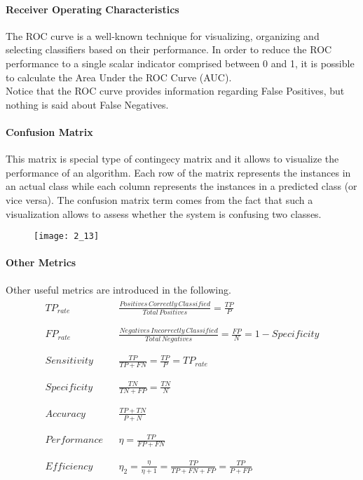 \paragraph{Receiver Operating Characteristics} The ROC curve is a well-known technique
for visualizing, organizing and selecting classifiers based on their performance.
In order to reduce the ROC performance to a single scalar indicator comprised between 0 and 1,
it is possible to calculate the Area Under the ROC Curve (AUC).\\
Notice that the ROC curve provides information regarding False Positives, but nothing
is said about False Negatives.
\paragraph{Confusion Matrix} This matrix is special type of contingecy matrix and
it allows to visualize the performance of an algorithm. Each row of the matrix
represents the instances in an actual class while each column represents the instances
in a predicted class (or vice versa). The confusion matrix term comes from the fact that
such a visualization allows to assess whether the system is confusing two classes.
\begin{figure}[H]
    \texttt{[image: 2\_13]}
    \centering
\end{figure}
\paragraph{Other Metrics} Other useful metrics are introduced in the following.
\begin{align*}
    \begin{matrix}
        TP_{rate}   &  & \frac{Positives\,Correctly\,Classified}{Total\,Positives}=\frac{TP}{P}                 \\\\\\
        FP_{rate}   &  & \frac{Negatives\,Incorrectly\,Classified}{Total\,Negatives}=\frac{FP}{N}=1-Specificity \\\\\\
        Sensitivity &  & \frac{TP}{TP+FN}=\frac{TP}{P}=TP_{rate}                                                \\\\\\
        Specificity &  & \frac{TN}{TN+FP}=\frac{TN}{N}                                                          \\\\\\
        Accuracy    &  & \frac{TP+TN}{P+N}                                                                      \\\\\\
        Performance &  & \eta=\frac{TP}{FP+FN}                                                                  \\\\\\
        Efficiency  &  & \eta_2=\frac{\eta}{\eta+1}=\frac{TP}{TP+FN+FP}=\frac{TP}{P+FP}
    \end{matrix}
\end{align*}
